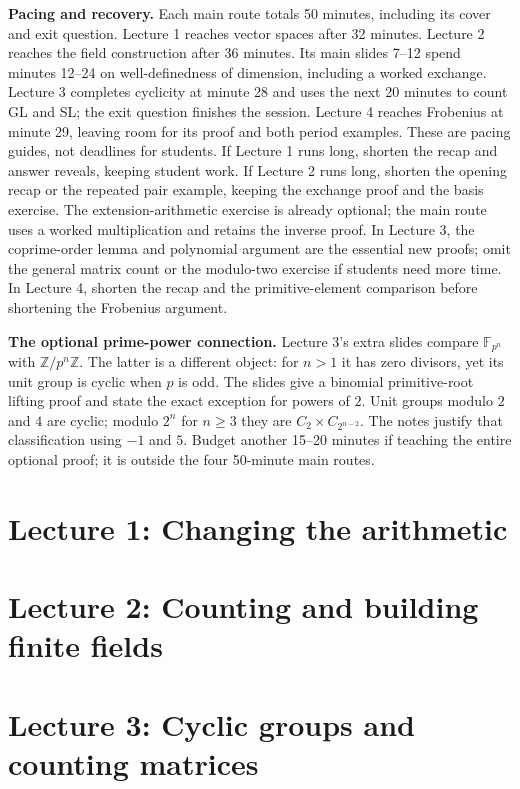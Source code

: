 \documentclass[11pt]{article}
\newcommand{\Z}{\mathbb Z}
\newcommand{\F}{\mathbb F}
\newcounter{slide}
\newcounter{elapsed}
\begin{document}
\textbf{Pacing and recovery.}
Each main route totals 50 minutes, including its cover and exit question.
Lecture 1 reaches vector spaces after 32 minutes. Lecture 2 reaches the
field construction after 36 minutes. Its main slides 7--12 spend minutes
12--24 on well-definedness of dimension, including a worked exchange.
Lecture 3 completes cyclicity at minute 28 and uses the next 20
minutes to count GL and SL; the exit question finishes the session.
Lecture 4 reaches Frobenius at minute 29, leaving room for its proof
and both period examples.
These are pacing guides, not deadlines for students. If Lecture 1 runs
long, shorten the recap and answer reveals, keeping student work. If
Lecture 2 runs long, shorten the opening recap or the repeated pair
example, keeping the exchange proof and the basis exercise. The
extension-arithmetic exercise is already optional; the main route
uses a worked multiplication and retains the inverse proof.
In Lecture 3, the coprime-order lemma and
polynomial argument are the essential new proofs; omit the general
matrix count or the modulo-two exercise if students need more time.
In Lecture 4, shorten the recap and the primitive-element comparison
before shortening the Frobenius argument.

\textbf{The optional prime-power connection.}
Lecture 3's extra slides compare $\F_{p^n}$ with $\Z/p^n\Z$. The latter
is a different object: for $n>1$ it has zero divisors, yet its unit group
is cyclic when $p$ is odd. The slides give a binomial primitive-root
lifting proof and state the exact exception for powers of $2$.
Unit groups modulo $2$ and $4$ are cyclic; modulo $2^n$ for $n\ge3$ they
are $C_2\times C_{2^{n-2}}$. The notes justify that classification using
$-1$ and $5$. Budget another 15--20 minutes if teaching the entire
optional proof; it is outside the four 50-minute main routes.

\section*{Lecture 1: Changing the arithmetic}

\clearpage
\setcounter{slide}{0}\setcounter{elapsed}{0}
\section*{Lecture 2: Counting and building finite fields}

\clearpage
\setcounter{slide}{0}\setcounter{elapsed}{0}
\section*{Lecture 3: Cyclic groups and counting matrices}

\clearpage
\setcounter{slide}{0}\setcounter{elapsed}{0}
\end{document}
